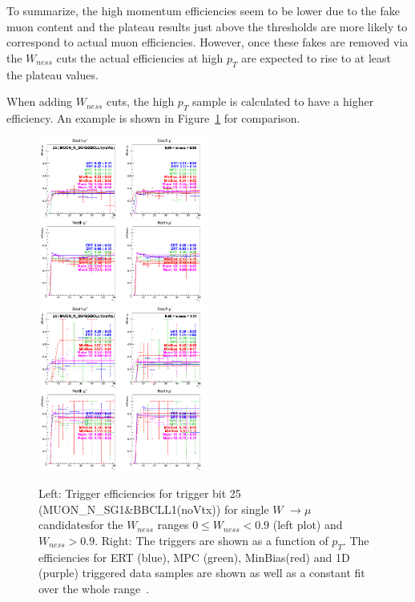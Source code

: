 To summarize, the high momentum efficiencies seem to be lower due to the fake
muon content and the plateau results just above the thresholds are more likely
to correspond to actual muon efficiencies. However, once these fakes are removed
via the $W_{ness}$ cuts the actual efficiencies at high $p_T$
are expected to rise to at least the plateau values.  

When adding $W_{ness}$ cuts, the high $p_T$ sample is calculated to have a
higher efficiency. An example is shown in
Figure~\ref{fig:run13_trigeffiptlowhighpt} for comparison.

\begin{figure}[ht]
  \centering
  \includegraphics[width=0.5\textwidth]{./figures/run13_trigeffipt_iw0_trig25_lin.png}
  \includegraphics[width=0.5\textwidth]{./figures/run13_trigeffipt_iw1_trig25_lin.png}
  \caption{
    Left: Trigger efficiencies for trigger bit 25 (MUON\_N\_SG1\&BBCLL1(noVtx))
    for single $W$ $\rightarrow \mu$ candidatesfor the $W_{ness}$ ranges  $ 0
    \leq W_{ness} < 0.9 $ (left plot) and $W_{ness} > 0.9$. Right: The triggers
    are shown as a function of $p_T$. The efficiencies for ERT
    (blue), MPC (green), MinBias(red) and 1D (purple) triggered data samples are
    shown as well as a constant fit over the whole range~\cite{Seidl2014}.
  }
  \label{fig:run13_trigeffiptlowhighpt} 
\end{figure}


